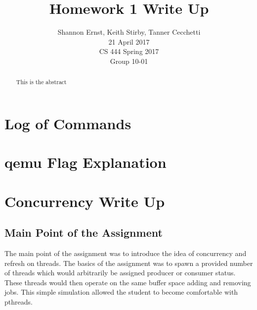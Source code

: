 \documentclass[letterpaper,10pt,serif,draftclsnofoot,onecolumn,compsoc,titlepage]{article}%
\title{Homework 1 Write Up}
\author{Shannon Ernst, Keith Stirby, Tanner Cecchetti \\ 21 April 2017 \\ CS 444 Spring 2017 \\ Group 10-01}
\begin{document}
\maketitle
\begin{abstract}
This is the abstract
\end{abstract}
\newpage
\section{Log of Commands}
\section{qemu Flag Explanation}
\section{Concurrency Write Up}
\subsection{Main Point of the Assignment}
The main point of the assignment was to introduce the idea of 
concurrency and refresh on threads. The basics of the assignment was
to spawn a provided number of threads which would arbitrarily be assigned
 producer or consumer status. These threads would then operate on the same
 buffer space adding and removing jobs. This simple simulation allowed 
 the student to become comfortable with pthreads. 
\end{document}
